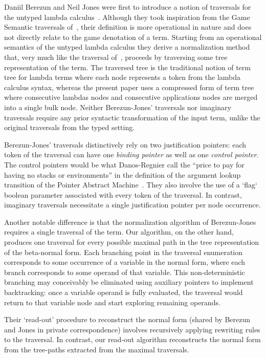 \documentclass{elsarticle}
\theoremstyle{plain}
\theoremstyle{definition}
\begin{document}
Daniil Berezun and Neil Jones were first to introduce a notion of traversals for the untyped lambda calculus~\cite{JonesBerezunLLL-PEPM17}.
Although they took inspiration from the Game Semantic traversals of~\cite{OngLics2006,BlumGalop2008}, their definition is more operational in nature and does not directly relate to the game denotation of a term. Starting from an operational semantics of the untyped lambda calculus they derive a normalization method that, very much like the traversal of~\cite{OngLics2006, BlumPhd}, proceeds by traversing some tree representation of the term.
%
The traversed tree is the traditional notion of term tree for lambda terms where each node represents a token from the lambda calculus syntax,
whereas the present paper uses a compressed form of term tree where consecutive lambdas nodes and consecutive applications nodes are merged into a single bulk node. Neither Berezun-Jones' traversals nor imaginary traversals require any prior syntactic transformation of the input term,
unlike the original traversals from the typed setting.

Berezun-Jones' traversals distinctively rely on two justification pointers: each token of the traversal can have one \emph{binding pointer} as well as one \emph{control pointer}. The control pointers would be what Danos-Regnier call the ``price to pay for having no stacks or environments'' in the definition of the argument lookup transition of the Pointer Abstract Machine~\cite{danos-head}. They also involve the use of a `flag` boolean parameter associated with every token of the traversal.
In contrast, imaginary traversals necessitate a single justification pointer per node occurrence.

Another notable difference is that the normalization algorithm of Berezun-Jones requires a single traversal of the term. Our algorithm, on the other hand, produces one traversal for every possible maximal path in the tree representation of the beta-normal form. Each branching point in the traversal enumeration corresponds to some occurrence of a variable in the normal form, where each branch corresponds to some operand of that variable. This non-deterministic branching may conceivably be eliminated using auxiliary pointers to implement backtracking: once a variable operand is fully evaluated, the traversal would return to that variable node and start exploring remaining operands.

Their `read-out' procedure to reconstruct the normal form (shared by Berezun and Jones in private correspondence) involves recursively applying rewriting rules to the traversal. In contrast, our read-out algorithm reconstructs the normal form from the tree-paths extracted from the maximal traversals.
\end{document}
